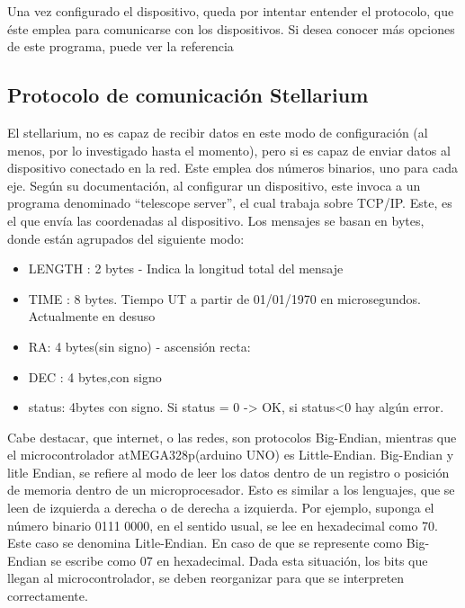 Una vez configurado el dispositivo, queda por intentar entender el protocolo, que éste emplea para comunicarse con los dispositivos. Si desea conocer más opciones de este programa, puede ver la referencia \cite{stellman}

\subsection{Protocolo de comunicación Stellarium} \label{sub:comun_stell}
El stellarium, no es capaz de recibir datos en este modo de configuración (al menos, por lo investigado hasta el momento), pero si es capaz de enviar datos al dispositivo conectado en la red. Este emplea dos números binarios, uno para cada eje. Según su documentación, al configurar un dispositivo, este invoca a un programa denominado ``telescope server'', el cual trabaja sobre TCP/IP. Este, es el que envía las coordenadas al dispositivo. Los mensajes se basan en bytes, donde están agrupados del siguiente modo: 

\begin{itemize}
	\item LENGTH : 2 bytes - Indica la longitud total del mensaje
	\item TIME : 8 bytes. Tiempo UT a partir de 01/01/1970 en microsegundos. Actualmente en desuso 
	\item RA: 4 bytes(sin signo) - ascensión recta: 
	\item DEC : 4 bytes,con signo
	\item status: 4bytes con signo. Si status = 0 -> OK, si status<0 hay algún error.  
\end{itemize}

Cabe destacar, que internet, o las redes, son protocolos Big-Endian, mientras que el microcontrolador atMEGA328p(arduino UNO) es Little-Endian. Big-Endian y litle Endian, se refiere al modo de leer los datos dentro de un registro o posición de memoria dentro de un microprocesador. Esto es similar a los lenguajes, que se leen de izquierda a derecha o de derecha a izquierda. Por ejemplo, suponga el número binario 0111 0000, en el sentido usual, se lee en hexadecimal como 70. Este caso se denomina Litle-Endian. En caso de que se represente como Big-Endian se escribe como 07 en hexadecimal. Dada esta situación, los bits que llegan al microcontrolador, se deben reorganizar para que se interpreten correctamente. 

